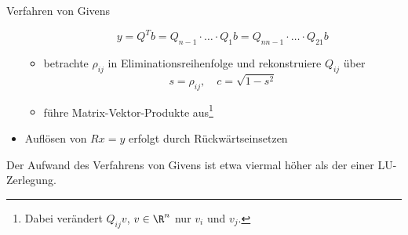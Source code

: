 \begin{defi}{Verfahren von Givens}
\begin{itemize}
\begin{itemize}
\[                            y = Q^Tb =  Q_{n-1} \cdot \ldots \cdot Q_1 b = Q_{nn-1} \cdot \ldots \cdot Q_{21} b
                        \]
                  \item betrachte $\rho_{ij}$ in Eliminationsreihenfolge und rekonstruiere $Q_{ij}$ über
                        \[
                            s = \rho_{ij}, \quad c = \sqrt{1 - s^2}
                        \]
                  \item führe Matrix-Vektor-Produkte aus\footnote{Dabei verändert $Q_{ij} v$, $v \in \R^n$ nur $v_i$ und $v_j$.}
              \end{itemize}
        \item Auflösen von $Rx = y$ erfolgt durch Rückwärtseinsetzen
    \end{itemize}
    
    Der Aufwand des Verfahrens von Givens ist etwa viermal höher als der einer LU-Zerlegung.
\end{defi}

